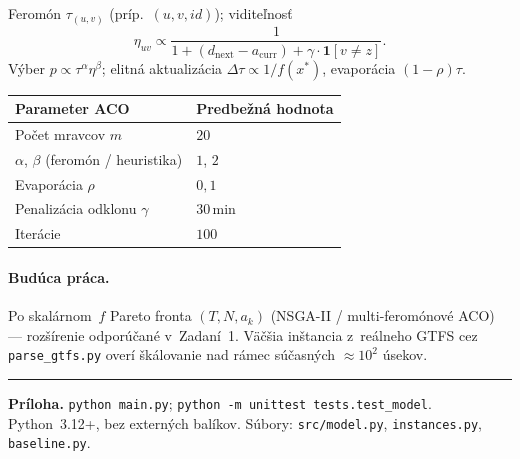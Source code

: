 \documentclass[11pt,a4paper]{article}
\begin{document}
Feromón $\tau_{(u,v)}$ (príp.\ $(u,v,id)$); viditeľnosť
\begin{equation}
  \eta_{uv}
  \propto
  \frac{1}{1+(d_{\mathrm{next}}-a_{\mathrm{curr}})+\gamma\cdot\mathbf{1}[v\neq z]}.
\end{equation}
Výber $p\propto\tau^{\alpha}\eta^{\beta}$; elitná aktualizácia
$\Delta\tau\propto 1/f(x^{*})$, evaporácia $(1-\rho)\tau$.

\begin{center}
\small
\begin{tabular}{@{}ll@{}}
\toprule
Parameter ACO & Predbežná hodnota \\
\midrule
Počet mravcov $m$ & $20$ \\
$\alpha$, $\beta$ (feromón / heuristika) & $1$, $2$ \\
Evaporácia $\rho$ & $0{,}1$ \\
Penalizácia odklonu $\gamma$ & $30$\,min \\
Iterácie & $100$ \\
\bottomrule
\end{tabular}
\end{center}

\paragraph{Budúca práca.} Po skalárnom~$f$ Pareto fronta $(T,N,a_k)$
(NSGA-II / multi-feromónové ACO) --- rozšírenie odporúčané v~Zadaní~1.
Väčšia inštancia z~reálneho GTFS cez \texttt{parse\_gtfs.py} overí škálovanie
nad rámec súčasných $\approx 10^2$ úsekov.

\vspace{0.5em}
\hrule
\vspace{0.35em}
{\small
\noindent\textbf{Príloha.}
\texttt{python main.py}; \texttt{python -m unittest tests.test\_model}.
Python~3.12+, bez externých balíkov.
Súbory: \texttt{src/model.py}, \texttt{instances.py}, \texttt{baseline.py}.
}
\end{document}
